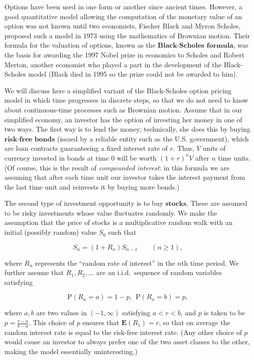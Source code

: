 \documentclass[11pt]{report}
\theoremstyle{plain}
\theoremstyle{definition}
\begin{document}
Options have been used in one form or another since ancient times. However, a good quantitative model allowing the computation of the monetary value of an option was not known until two economists, Fischer Black and Myron Scholes, proposed such a model in 1973 using the mathematics of Brownian motion. Their formula for the valuation of options, known as the $\textbf{Black-Scholes formula}$, was the basis for awarding the 1997 Nobel prize in economics to Scholes and Robert Merton, another economist who played a part in the development of the Black-Scholes model (Black died in 1995 so the prize could not be awarded to him).

We will discuss here a simplified variant of the Black-Scholes option pricing model in which time progresses in discrete steps, so that we do not need to know about continuous-time processes such as Brownian motion. Assume that in our simplified economy, an investor has the option of investing her money in one of two ways. The first way is to lend the money; technically, she does this by buying $\textbf{risk-free bonds}$ (issued by a reliable entity such as the U.S. government), which are loan contracts guaranteeing a fixed interest rate of $r$. Thus, $V$ units of currency invested in bonds at time $0$ will be worth $(1+r)^n V$ after $n$ time units. (Of course, this is the result of \emph{compounded interest}: in this formula we are assuming that after each time unit our investor takes the interest payment from the last time unit and reinvests it by buying more bonds.)

The second type of investment opportunity is to buy $\textbf{stocks}$. These are assumed to be risky investments whose value fluctuates randomly. We make the assumption that the price of stocks is a multiplicative random walk with an initial (possibly random) value $S_0$ such that

\[
S_n = (1+R_n) S_{n-1} \qquad (n\ge1),
\]

where $R_n$ represents the ``random rate of interest'' in the $n$th time period. We further assume that $R_1,R_2,\ldots$ are an i.i.d.\ sequence of random variables satisfying

\[
\mathrm{P}(R_n = a) = 1-p, \ \ \mathrm{P}(R_n = b) = p,
\]

where $a,b$ are two values in $(-1,\infty)$ satisfying $a<r<b$, and $p$ is taken to be $p=\frac{r-a}{b-a}$. This choice of $p$ ensures that $\mathbf{E}(R_1) = r$, so that on average the random interest rate is equal to the risk-free interest rate. (Any other choice of $p$ would cause an investor to always prefer one of the two asset classes to the other, making the model essentially uninteresting.)
\end{document}
